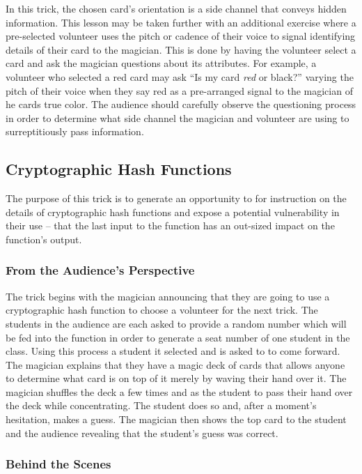In this trick, the chosen card's orientation is a side channel that conveys
hidden information.  This lesson may be taken further with an additional
exercise where a pre-selected volunteer uses the
pitch or cadence of their voice to signal identifying details of their
card to the magician.  This is done by having the volunteer select a card and
ask the magician questions about its attributes.  For example, a volunteer who
selected a red card may
ask ``Is my card \textit{red} or black?'' varying the pitch of their voice when
they say red as a pre-arranged signal to the magician of he cards true color.
The audience should carefully observe the questioning process in order to
determine what side channel the magician and volunteer are using to
surreptitiously pass information.


\subsection{Cryptographic Hash Functions}

The purpose of this trick is to generate an opportunity to for instruction on
the details of cryptographic hash functions and expose a potential vulnerability
in their use -- that the last input to the function has an out-sized impact on
the function's output.


\subsubsection{From the Audience's Perspective}

The trick begins with the magician announcing that they are going to use a
cryptographic hash function to choose a volunteer for the next trick.  The
students in the audience are each asked to provide a random number which will be
fed into the function in order to generate a seat number of one student in the
class.  Using this process a student it selected and is asked to to come
forward.  The magician explains that they have a magic deck of cards that allows
anyone to determine what card is on top of it merely by waving their hand over
it.  The magician shuffles the deck a few times and as the student to pass their
hand over the deck while concentrating.  The student does so and, after a
moment's hesitation, makes a guess.  The magician then shows the top card to the
student and the audience revealing that the student's guess was correct.

\subsubsection{Behind the Scenes}

